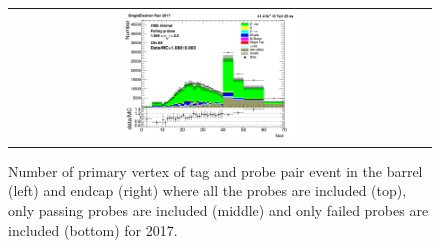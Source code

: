 \begin{figure}[htp]
\begin{center}
\begin{tabular}{cc}
      \includegraphics[width=0.45\textwidth]{figures/Zprime/2017/ScaleFactor/SameSign/nominal/stack_nVtx_Endcap_fail_PUW.png}
    \end{tabular}
    \caption{Number of primary vertex of tag and probe pair event in the barrel (left) and endcap (right) where all the probes are included (top), only passing probes are included (middle) and only failed probes are included (bottom) for 2017.}
    \label{fig:SS_nominal_PV_2017}
  \end{center}
\end{figure}

\clearpage
